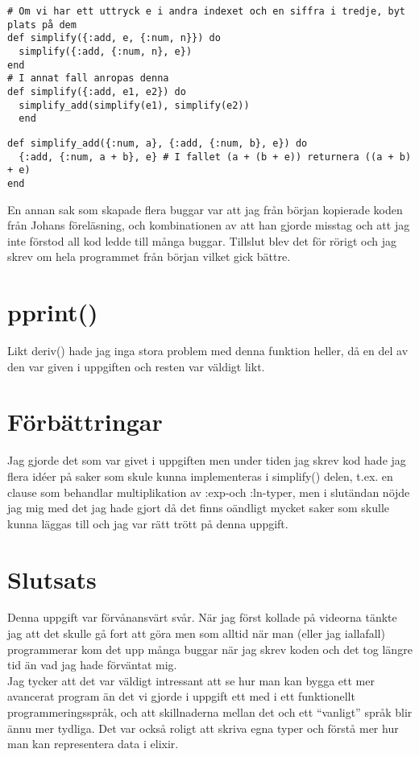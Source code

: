 \documentclass[a4paper,11pt]{article}
\begin{document}
\begin{verbatim}
# Om vi har ett uttryck e i andra indexet och en siffra i tredje, byt plats på dem
def simplify({:add, e, {:num, n}}) do
  simplify({:add, {:num, n}, e})
end
# I annat fall anropas denna
def simplify({:add, e1, e2}) do
  simplify_add(simplify(e1), simplify(e2))
  end
\end{verbatim}

\begin{verbatim}
def simplify_add({:num, a}, {:add, {:num, b}, e}) do
  {:add, {:num, a + b}, e} # I fallet (a + (b + e)) returnera ((a + b) + e)
end
\end{verbatim}

En annan sak som skapade flera buggar var att jag från början kopierade koden från Johans föreläsning, och kombinationen av att han gjorde misstag och att jag inte förstod all kod ledde till många buggar. Tillslut blev det för rörigt och jag skrev om hela programmet från början vilket gick bättre.

\section*{pprint()}
Likt deriv() hade jag inga stora problem med denna funktion heller, då en del av den var given i uppgiften och resten var väldigt likt.

\section*{Förbättringar}
Jag gjorde det som var givet i uppgiften men under tiden jag skrev kod hade jag flera idéer på saker som skule kunna implementeras i simplify() delen, t.ex. en clause som behandlar multiplikation av :exp-och :ln-typer, men i slutändan nöjde jag mig med det jag hade gjort då det finns oändligt mycket saker som skulle kunna läggas till och jag var rätt trött på denna uppgift.

\section*{Slutsats}
Denna uppgift var förvånansvärt svår. När jag först kollade på videorna tänkte jag att det skulle gå fort att göra men som alltid när man (eller jag iallafall) programmerar kom det upp många buggar när jag skrev koden och det tog längre tid än vad jag hade förväntat mig. \\
Jag tycker att det var väldigt intressant att se hur man kan bygga ett mer avancerat program än det vi gjorde i uppgift ett med i ett funktionellt programmeringsspråk, och att skillnaderna mellan det och ett ``vanligt'' språk blir ännu mer tydliga. Det var också roligt att skriva egna typer och förstå mer hur man kan representera data i elixir.
\end{document}
